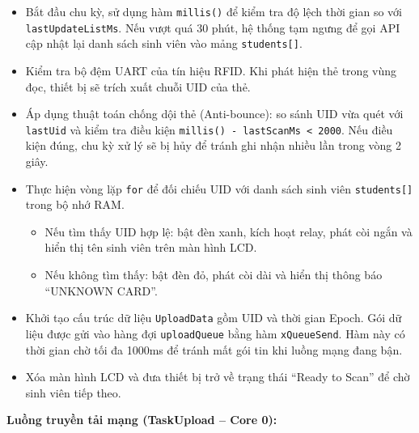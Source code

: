 \documentclass[12pt,a4paper]{report}
\begin{document}
\begin{itemize}

\item Bắt đầu chu kỳ, sử dụng hàm \texttt{millis()} để kiểm tra độ lệch thời gian so với 
\texttt{lastUpdateListMs}. Nếu vượt quá 30 phút, hệ thống tạm ngưng để gọi API 
cập nhật lại danh sách sinh viên vào mảng \texttt{students[]}.

\item Kiểm tra bộ đệm UART của tín hiệu RFID. Khi phát hiện thẻ trong vùng đọc,
thiết bị sẽ trích xuất chuỗi UID của thẻ.

\item Áp dụng thuật toán chống dội thẻ (Anti-bounce): so sánh UID vừa quét với 
\texttt{lastUid} và kiểm tra điều kiện 
\texttt{millis() - lastScanMs < 2000}. 
Nếu điều kiện đúng, chu kỳ xử lý sẽ bị hủy để tránh ghi nhận nhiều lần trong vòng 2 giây.

\item Thực hiện vòng lặp \texttt{for} để đối chiếu UID với danh sách sinh viên 
\texttt{students[]} trong bộ nhớ RAM.

\begin{itemize}

\item Nếu tìm thấy UID hợp lệ: bật đèn xanh, kích hoạt relay, phát còi ngắn 
và hiển thị tên sinh viên trên màn hình LCD.

\item Nếu không tìm thấy: bật đèn đỏ, phát còi dài và hiển thị thông báo 
``UNKNOWN CARD''.

\end{itemize}

\item Khởi tạo cấu trúc dữ liệu \texttt{UploadData} gồm UID và thời gian 
Epoch. Gói dữ liệu được gửi vào hàng đợi \texttt{uploadQueue} bằng hàm 
\texttt{xQueueSend}. Hàm này có thời gian chờ tối đa 1000ms để tránh mất gói tin 
khi luồng mạng đang bận.

\item Xóa màn hình LCD và đưa thiết bị trở về trạng thái 
``Ready to Scan'' để chờ sinh viên tiếp theo.

\end{itemize}

\textbf{Luồng truyền tải mạng (TaskUpload -- Core 0):}
\end{document}
